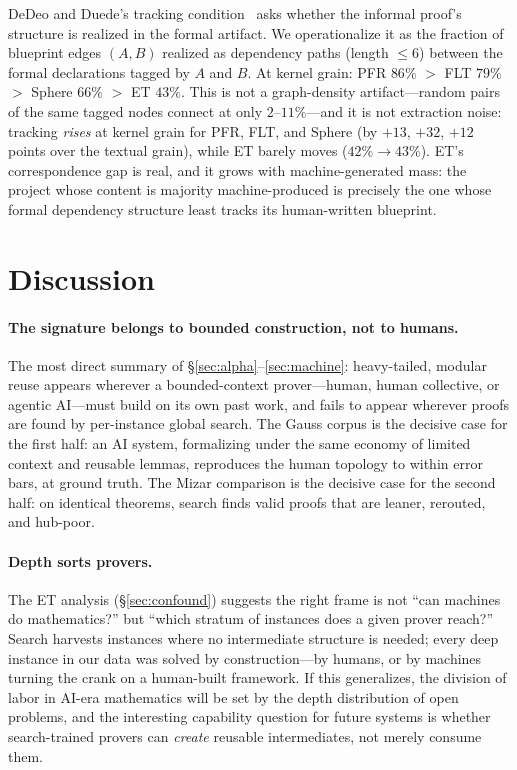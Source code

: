 \documentclass[11pt]{article}
\begin{document}
DeDeo and Duede's tracking condition~\cite{dedeo2026} asks whether the informal proof's
structure is realized in the formal artifact. We operationalize it as the fraction of blueprint
edges $(A, B)$ realized as dependency paths (length $\le 6$) between the formal declarations
tagged by $A$ and $B$. At kernel grain: PFR $86\%$ $>$ FLT $79\%$ $>$ Sphere $66\%$ $>$ ET
$43\%$. This is not a graph-density artifact---random pairs of the same tagged nodes connect
at only $2$--$11\%$---and it is not extraction noise: tracking \emph{rises} at kernel grain for
PFR, FLT, and Sphere (by $+13$, $+32$, $+12$ points over the textual grain), while ET barely
moves ($42\% \to 43\%$). ET's correspondence gap is real, and it grows with machine-generated
mass: the project whose content is majority machine-produced is precisely the one whose formal
dependency structure least tracks its human-written blueprint.

\section{Discussion}
\label{sec:discussion}

\paragraph{The signature belongs to bounded construction, not to humans.} The most direct
summary of \S\ref{sec:alpha}--\ref{sec:machine}: heavy-tailed, modular reuse appears wherever a
bounded-context prover---human, human collective, or agentic AI---must build on its own past
work, and fails to appear wherever proofs are found by per-instance global search. The Gauss
corpus is the decisive case for the first half: an AI system, formalizing under the same
economy of limited context and reusable lemmas, reproduces the human topology to within error
bars, at ground truth. The Mizar comparison is the decisive case for the second half: on
identical theorems, search finds valid proofs that are leaner, rerouted, and hub-poor.

\paragraph{Depth sorts provers.} The ET analysis (\S\ref{sec:confound}) suggests the right
frame is not ``can machines do mathematics?'' but ``which stratum of instances does a given
prover reach?'' Search harvests instances where no intermediate structure is needed; every deep
instance in our data was solved by construction---by humans, or by machines turning the crank
on a human-built framework. If this generalizes, the division of labor in AI-era mathematics
will be set by the depth distribution of open problems, and the interesting capability question
for future systems is whether search-trained provers can \emph{create} reusable intermediates,
not merely consume them.
\end{document}
